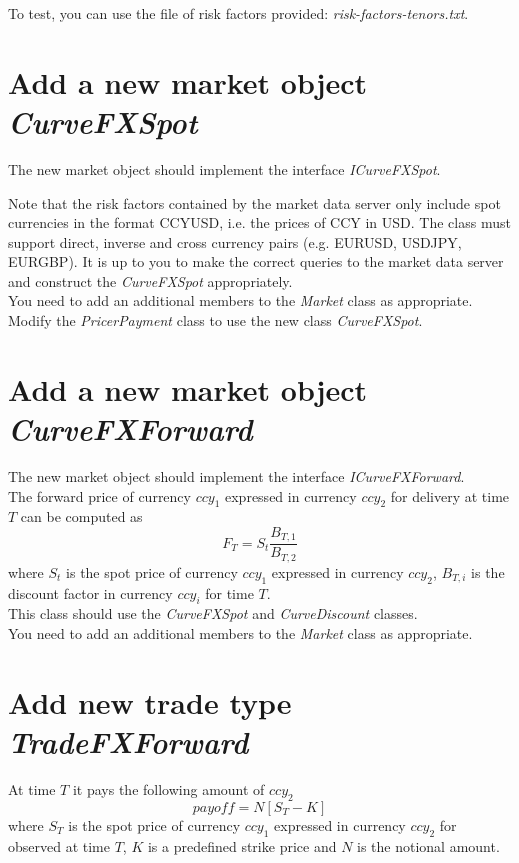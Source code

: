 \documentclass[10pt]{article}
\begin{document}
To test, you can use the file of risk factors provided: \textit{risk-factors-tenors.txt}.

\section{Add a new market object \textit{CurveFXSpot}}
The new market object should implement the interface \textit{ICurveFXSpot}.

Note that the risk factors contained by the market data server only include spot currencies in the format CCYUSD, i.e. the prices of CCY in USD. The class must support direct, inverse and cross currency pairs (e.g. EURUSD, USDJPY, EURGBP). It is up to you to make the correct queries to the market data server and construct the \textit{CurveFXSpot} appropriately.\\

You need to add an additional members to the \textit{Market} class as appropriate.\\

Modify the \textit{PricerPayment} class to use the new class \textit{CurveFXSpot}.

\section{Add a new market object \textit{CurveFXForward}}
The new market object should implement the interface \textit{ICurveFXForward}.\\

The forward price of currency $ccy_1$ expressed in currency $ccy_2$ for delivery at time $T$ can be computed as
$$F_T=S_t \frac{B_{T,1}}{B_{T,2}}$$
where $S_t$ is the spot price of currency $ccy_1$ expressed in currency $ccy_2$, $B_{T,i}$ is the discount factor in currency $ccy_i$ for time $T$.\\

This class should use the \textit{CurveFXSpot} and \textit{CurveDiscount} classes.\\

You need to add an additional members to the \textit{Market} class as appropriate.

\section{Add new trade type \textit{TradeFXForward}}
At time $T$ it pays the following amount of $ccy_2$
$$
payoff=N[S_T-K]
$$
where $S_T$ is the spot price of currency $ccy_1$ expressed in currency $ccy_2$ for observed at time $T$, $K$ is a predefined strike price and $N$ is the notional amount.\\
\end{document}
